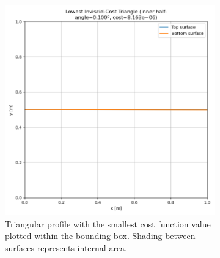 \documentclass[11pt]{article}
\begin{document}
\begin{figure}[H]
\begin{subfigure}[b]{0.45\textwidth}
    \includegraphics[width=\linewidth]{../results/inviscid/lowest_cost_triangle.png}
    \caption{Triangular profile with the smallest cost function value plotted within the bounding box. Shading between surfaces represents internal area.}
    \label{fig:inv-triangle-b}
\end{subfigure}
\caption{}
\label{fig:inv-triangle}
\end{figure}
\end{document}
